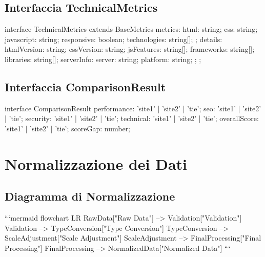 {{{{{{{\subsection{Interfaccia TechnicalMetrics}
\begin{asciiart}
interface TechnicalMetrics extends BaseMetrics {
  metrics: {
    html: string;
    css: string;
    javascript: string;
    responsive: boolean;
    technologies: string[];
  };
  details: {
    htmlVersion: string;
    cssVersion: string;
    jsFeatures: string[];
    frameworks: string[];
    libraries: string[];
    serverInfo: {
      server: string;
      platform: string;
    };
  };
}
\end{asciiart}

\subsection{Interfaccia ComparisonResult}
\begin{asciiart}
interface ComparisonResult {
  performance: 'site1' | 'site2' | 'tie';
  seo: 'site1' | 'site2' | 'tie';
  security: 'site1' | 'site2' | 'tie';
  technical: 'site1' | 'site2' | 'tie';
  overallScore: 'site1' | 'site2' | 'tie';
  scoreGap: number;
}
\end{asciiart}

\section{Normalizzazione dei Dati}

\subsection{Diagramma di Normalizzazione}

```mermaid
flowchart LR
    RawData["Raw Data"] --> Validation["Validation"]
    Validation --> TypeConversion["Type Conversion"]
    TypeConversion --> ScaleAdjustment["Scale Adjustment"]
    ScaleAdjustment --> FinalProcessing["Final Processing"]
    FinalProcessing --> NormalizedData["Normalized Data"]
```

}}}}}}}
